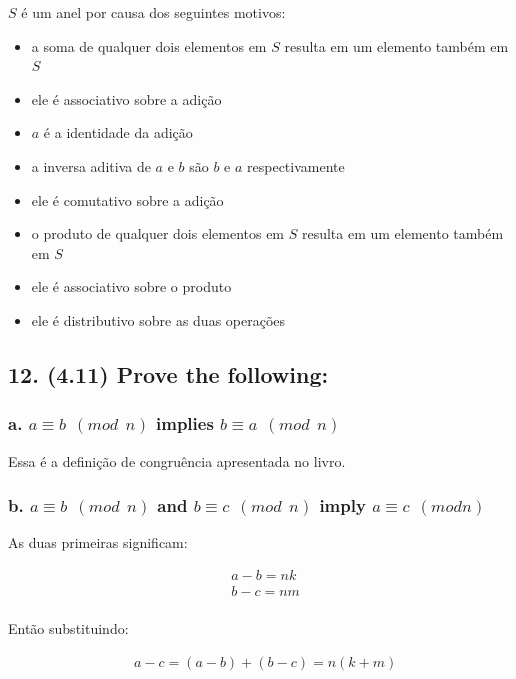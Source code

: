 \documentclass[fleqn, 12pt]{article}
\begin{document}
  $S$ é um anel por causa dos seguintes motivos:
  \begin{itemize}
    \item a soma de qualquer dois elementos em $S$ resulta em um elemento também
    em $S$
    \item ele é associativo sobre a adição
    \item $a$ é a identidade da adição
    \item a inversa aditiva de $a$ e $b$ são $b$ e $a$ respectivamente
    \item ele é comutativo sobre a adição
    \item o produto de qualquer dois elementos em $S$ resulta em um elemento
    também em $S$
    \item ele é associativo sobre o produto
    \item ele é distributivo sobre as duas operações
  \end{itemize}

\subsection*{12. (4.11) Prove the following:}

  \subsubsection*{a. $a \equiv b \ \ (mod \ \ n)$ implies $b \equiv a \ \ (mod \
  \ n)$}

    Essa é a definição de congruência apresentada no livro.

  \subsubsection*{b. $a \equiv b \ \ (mod \ \ n)$ and $b \equiv c \ \ (mod \ \
  n)$ imply $a \equiv c \ \ (mod n)$}

    As duas primeiras significam:

    \begin{align*}
      & a - b = nk \\
      & b - c = nm \\
    \end{align*}

    Então substituindo:

    \begin{align*}
      & a - c = (a - b) + (b - c) = n (k + m)\\
    \end{align*}
\end{document}
